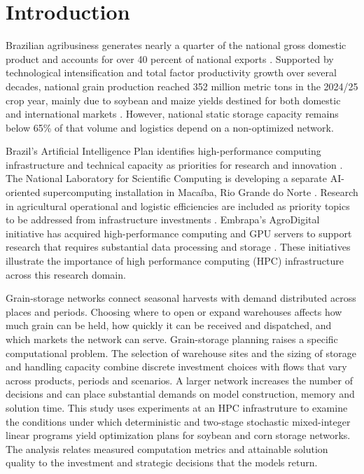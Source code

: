 \documentclass[
  english,
  11pt,
  a4paper,
  authoryear,
  preprint]{elsarticle}
\begin{document}
\section{Introduction}\label{introduction}
Brazilian agribusiness generates nearly a quarter of the national gross domestic product and accounts for over 40 percent of national exports \citep{basso_agriculture_2024}. Supported by technological intensification and total factor productivity growth over several decades, national grain production reached 352 million metric tons in the 2024/25 crop year, mainly due to soybean and maize yields destined for both domestic and international markets \citep{conab_portal_2026b,mascarenhas2014}. However, national static storage capacity remains below 65\% of that volume \citep{conab_portal_2026a} and logistics depend on a non-optimized network.

Brazil's Artificial Intelligence Plan identifies
high-performance computing infrastructure and technical capacity as priorities for research and innovation \citep{mcti2025pbia}. The National Laboratory for Scientific Computing is developing a separate AI-oriented supercomputing installation in Macaíba, Rio Grande do Norte \citep{lncc2026supercomputador}. Research in agricultural operational and logistic efficiencies are included as priority topics to be addressed from infrastructure investments \citep{pera2026}.
Embrapa's AgroDigital initiative has acquired high-performance computing and GPU servers to support research that requires substantial data
processing and storage \citep{embrapa2024datacenter}. These initiatives illustrate the importance of high performance computing (HPC) infrastructure across this research domain.

Grain-storage networks connect seasonal harvests with demand distributed
across places and periods. Choosing where to open or expand warehouses
affects how much grain can be held, how quickly it can be received and
dispatched, and which markets the network can serve.
Grain-storage planning raises a specific computational problem. The
selection of warehouse sites and the sizing of storage and handling
capacity combine discrete investment choices with flows that vary across
products, periods and scenarios. A larger network increases the number
of decisions and can place substantial demands on model construction,
memory and solution time. This study uses experiments at an HPC infrastruture to
examine the conditions under which deterministic and two-stage
stochastic mixed-integer linear programs yield optimization plans for soybean and corn storage networks. The analysis relates measured computation metrics and attainable solution quality to the investment and strategic decisions that the models
return.
\end{document}
